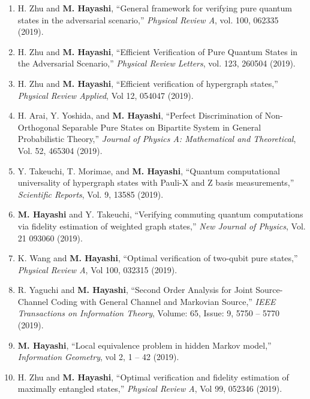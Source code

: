 \documentclass[a4paper,12pt,oneside]{article}
\begin{document}
\begin{enumerate}
\item 
H. Zhu and \textbf{M. Hayashi},
``General framework for verifying pure quantum states in the adversarial scenario,''
{\em Physical Review A}, 
vol. 100, 062335 (2019).
 
\item 
H. Zhu and \textbf{M. Hayashi},
``Efficient Verification of Pure Quantum States in the Adversarial Scenario,''
{\em Physical Review Letters}, 
vol. 123, 260504 (2019).

\item 
H. Zhu and \textbf{M. Hayashi},
``Efficient verification of hypergraph states,''
{\em Physical Review Applied}, 
Vol 12, 054047 (2019).

\item 
H. Arai, Y. Yoshida, and \textbf{M. Hayashi},
``Perfect Discrimination of Non-Orthogonal Separable Pure States on Bipartite System in General Probabilistic Theory,''
{\em Journal of Physics A: Mathematical and Theoretical}, 
Vol. 52, 465304 (2019).

\item 
Y. Takeuchi, T. Morimae, and \textbf{M. Hayashi},
``Quantum computational
universality of hypergraph states with Pauli-X and Z basis measurements,''
{\em Scientific Reports}, Vol. 9, 13585 (2019).

\item 
\textbf{M. Hayashi} and Y. Takeuchi, 
``Verifying commuting quantum computations via fidelity estimation of weighted graph states,''
{\em New Journal of Physics}, Vol. 21 093060 (2019).

\item 
K. Wang and \textbf{M. Hayashi},
``Optimal verification of two-qubit pure states,''
{\em Physical Review A}, 
Vol 100, 032315 (2019).

\item 
R. Yaguchi and \textbf{M. Hayashi}, 
``Second Order Analysis for Joint Source-Channel Coding with General Channel and Markovian Source,''
{\em IEEE Transactions on Information Theory}, 
Volume: 65, Issue: 9, 5750 -- 5770 (2019). 

\item 
\textbf{M. Hayashi}, 
``Local equivalence problem in hidden Markov model,''
{\em Information Geometry}, 
vol 2, 1 -- 42 (2019). 

\item 
H. Zhu and \textbf{M. Hayashi}, 
``Optimal verification and fidelity estimation of maximally entangled states,''
{\em Physical Review A}, Vol 99, 052346 (2019).


\end{enumerate}
\end{document}
